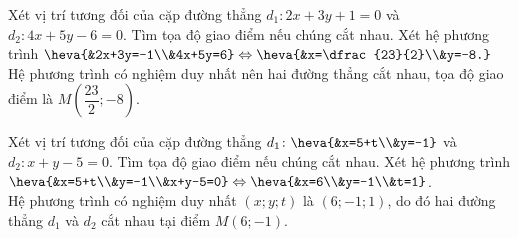 \begin{bt}%
	Xét vị trí tương đối của cặp đường thẳng $d_1\colon 2x+3y+1=0$ và $d_2\colon 4x+5y-6=0$. Tìm tọa độ giao điểm nếu chúng cắt nhau.
	\loigiai
	{Xét hệ phương trình $\heva{&2x+3y=-1\\&4x+5y=6} \Leftrightarrow \heva{&x=\dfrac{23}{2}\\&y=-8.}$\\
		Hệ phương trình có nghiệm duy nhất nên hai đường thẳng cắt nhau, tọa độ giao điểm là $M\left(\dfrac{23}{2};-8\right)$.}
\end{bt}

\begin{bt}%
	Xét vị trí tương đối của cặp đường thẳng $d_1\colon \heva{&x=5+t\\&y=-1}$ và $d_2\colon x+y-5=0$. Tìm tọa độ giao điểm nếu chúng cắt nhau.
	\loigiai
	{Xét hệ phương trình $\heva{&x=5+t\\&y=-1\\&x+y-5=0} \Leftrightarrow \heva{&x=6\\&y=-1\\&t=1}$.\\
		Hệ phương trình có nghiệm duy nhất $(x;y;t)$ là $(6;-1;1)$, do đó hai đường thẳng $d_1$ và $d_2$ cắt nhau tại điểm $M(6;-1)$.}
\end{bt}

